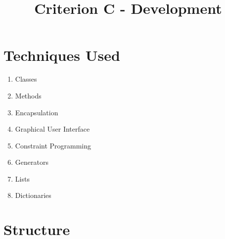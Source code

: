 \documentclass[12pt]{article}
\title{Criterion C - Development}
\author{}
\date{}
\begin{document}
\maketitle

\section{Techniques Used}

\begin{enumerate}
    \item Classes
    \item Methods
    \item Encapsulation
    \item Graphical User Interface
    \item Constraint Programming
    \item Generators
    \item Lists
    \item Dictionaries
\end{enumerate}

\section{Structure}
\end{document}
